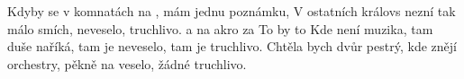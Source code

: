 \begin{TEXT}{Kdyby se v komnatách}
\SLOKA {} na , mám jednu poznámku,\NL
    \NL
   V ostatních královs nezní tak málo smích,\NL
    neveselo,  truchlivo.
\REFREN {}  \NL
   a na  akro za\NL
     \NL
   To by   to 
\SLOKA Kde není muzika, tam duše naříká,\NL
   tam je neveselo, tam je truchlivo.\NL
   Chtěla bych dvůr pestrý, kde znějí orchestry,\NL
   pěkně na veselo, žádné truchlivo.
\REFRENHRAJ
\end{TEXT}
